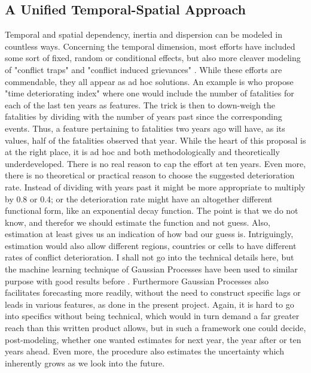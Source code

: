 \documentclass[a4paper]{article}
\begin{document}
\subsection{A Unified Temporal-Spatial Approach}

Temporal and spatial dependency, inertia and dispersion can be modeled in countless ways. Concerning the temporal dimension, most efforts have included some sort of fixed, random or conditional effects, but also more cleaver modeling of "conflict traps" and "conflict induced grievances" \citep{Collier_Hoeffler_2004, Hegre_Sambanis_2006, Cederman_Gleditsch_Buhaug_2013, perry_2013}. While these efforts are commendable, they all appear as ad hoc solutions. An example is \cite{perry_2013} who propose "time deteriorating index" where one would include the number of fatalities for each of the last ten years as features. The trick is then to down-weigh the fatalities by dividing with the number of years past since the corresponding events. Thus, a feature pertaining to fatalities two years ago will have, as its values, half of the fatalities observed that year\cite[14]{perry_2013}. While the heart of this proposal is at the right place, it is ad hoc and both methodologically and theoretically underdeveloped. There is no real reason to cap the effort at ten years. Even more, there is no theoretical or practical reason to choose the suggested deterioration rate. Instead of dividing with years past it might be more appropriate to multiply by 0.8 or 0.4; or the deterioration rate might have an altogether different functional form, like an exponential decay function. The point is that we do not know, and therefor we should estimate the function and not guess. Also, estimation at least gives us an indication of how bad our guess is. Intriguingly, estimation would also allow different regions, countries or cells to have different rates of conflict deterioration. I shall not go into the technical details here, but the machine learning technique of Gaussian Processes have been used to similar purpose with good results before \citep{Gelman_2013, Mcelreath_2018}. Furthermore Gaussian Processes also facilitates forecasting more readily, without the need to construct specific lags or leads in various features, as done in the present project. Again, it is hard to go into specifics without being technical, which would in turn demand a far greater reach than this written product allows, but in such a framework one could decide, post-modeling, whether one wanted estimates for next year, the year after or ten years ahead. Even more, the procedure also estimates the uncertainty which inherently grows as we look into the future.\par
 
\end{document}
